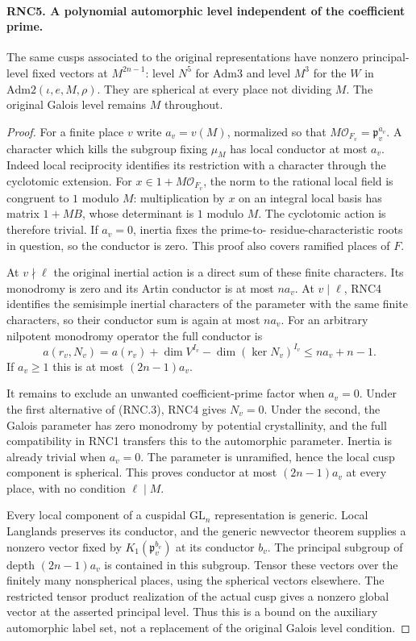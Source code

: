 \documentclass[11pt,a4paper]{article}
\numberwithin{equation}{section}
\theoremstyle{remark}\newtheorem{remark}[theorem]{Remark}
\begin{document}
\paragraph{RNC5. A polynomial automorphic level independent of the coefficient prime.}
\label{claim:RNC5}
The same cusps associated to the original representations have
nonzero principal-level fixed vectors at $M^{2n-1}$: level
$N^5$ for $\mathrm{Adm3}$ and level $M^3$ for the $W$ in
$\mathrm{Adm2}(\iota,e,M,\rho)$.  They are spherical at
every place not dividing $M$.  The original Galois level
remains $M$ throughout.
\begin{proof}
For a finite place $v$ write $a_v=v(M)$, normalized so that
$M\mathcal O_{F_v}=\mathfrak p_v^{a_v}$.  A character which
kills the subgroup fixing $\mu_M$ has local conductor at most
$a_v$.  Indeed local reciprocity identifies its restriction
with a character through the cyclotomic extension.  For
$x\in1+M\mathcal O_{F_v}$, the norm to the rational local
field is congruent to $1$ modulo $M$: multiplication by $x$
on an integral local basis has matrix $1+M B$, whose
determinant is $1$ modulo $M$.  The cyclotomic action is
therefore trivial.  If $a_v=0$, inertia fixes the prime-to-
residue-characteristic roots in question, so the conductor
is zero.  This proof also covers ramified places of $F$.

At $v\nmid\ell$ the original inertial action is a direct sum
of these finite characters.  Its monodromy is zero and its
Artin conductor is at most $n a_v$.  At $v\mid\ell$, RNC4
identifies the semisimple inertial characters of the parameter
with the same finite characters, so their conductor sum is
again at most $n a_v$.  For an arbitrary nilpotent monodromy
operator the full conductor is
\[
 a(r_v,N_v)=a(r_v)+\dim V^{I_v}-\dim(\ker N_v)^{I_v}
                              \leq n a_v+n-1.                 \tag{RNC.11}
\]
If $a_v\geq1$ this is at most $(2n-1)a_v$.

It remains to exclude an unwanted coefficient-prime factor
when $a_v=0$.  Under the first alternative of (RNC.3), RNC4
gives $N_v=0$.  Under the second, the Galois parameter has
zero monodromy by potential crystallinity, and the full
compatibility in RNC1 transfers this to the automorphic
parameter.  Inertia is already trivial when $a_v=0$.
The parameter is unramified, hence the local cusp component
is spherical.  This proves conductor at most $(2n-1)a_v$
at every place, with no condition $\ell\mid M$.

Every local component of a cuspidal $\mathrm{GL}_n$
representation is generic.  Local Langlands preserves its
conductor, and the generic newvector theorem supplies a
nonzero vector fixed by $K_1(\mathfrak p_v^{b_v})$ at its
conductor $b_v$.  The principal subgroup of depth
$(2n-1)a_v$ is contained in this subgroup.  Tensor these
vectors over the finitely many nonspherical places, using
the spherical vectors elsewhere.  The restricted tensor
product realization of the actual cusp gives a nonzero
global vector at the asserted principal level.  Thus this
is a bound on the auxiliary automorphic label set, not a
replacement of the original Galois level condition.
\end{proof}
\end{document}
